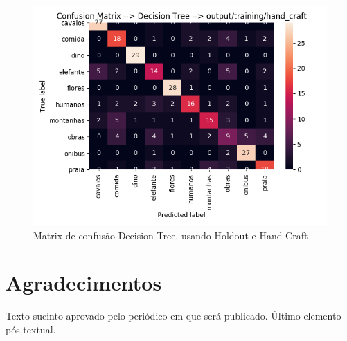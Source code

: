 \documentclass[
article,			%
11pt,				%
oneside,			%
a4paper,			%
english,			%
brazil,				%
sumario=tradicional,
]{abntex2}
\begin{document}
\begin{anexosenv}
	\begin{figure}[htb]
		\caption{\label{confusion-matrix-decision-tree-holdout-hand-craft}Matrix de confusão Decision Tree, usando Holdout e Hand Craft}
		\begin{center}
			\includegraphics[scale=0.5]{confusion-matrix-decision-tree-holdout-hand-craft.png}
		\end{center}
	\end{figure}
	
	\end{anexosenv}
	
	
	\section*{Agradecimentos}
	Texto sucinto aprovado pelo periódico em que será publicado. Último 
	elemento pós-textual.
	
\end{document}
